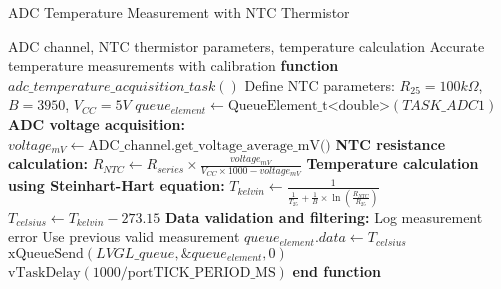\documentclass{article}
\begin{document}
\begin{algorithm}
\caption{ADC Temperature Measurement with NTC Thermistor}
\label{alg:adc_temperature_acquisition}
\begin{algorithmic}[1]
\REQUIRE ADC channel, NTC thermistor parameters, temperature calculation
\ENSURE Accurate temperature measurements with calibration
\STATE \textbf{function} $adc\_temperature\_acquisition\_task()$
\STATE Define NTC parameters: $R_{25} = 100k\Omega$, $B = 3950$, $V_{CC} = 5V$
\STATE $queue_{element} \leftarrow \text{QueueElement\_t<double>}(TASK\_ADC1)$
\STATE
{}
    \STATE \textbf{ADC voltage acquisition:}
    \STATE $voltage_{mV} \leftarrow \text{ADC\_channel.get\_voltage\_average\_mV()}$
    \STATE
    \STATE \textbf{NTC resistance calculation:}
    \STATE $R_{NTC} \leftarrow R_{series} \times \frac{voltage_{mV}}{V_{CC} \times 1000 - voltage_{mV}}$
    \STATE
    \STATE \textbf{Temperature calculation using Steinhart-Hart equation:}
    \STATE $T_{kelvin} \leftarrow \frac{1}{\frac{1}{T_{25}} + \frac{1}{B} \times \ln(\frac{R_{NTC}}{R_{25}})}$
    \STATE $T_{celsius} \leftarrow T_{kelvin} - 273.15$
    \STATE
    \STATE \textbf{Data validation and filtering:}
        \STATE Log measurement error
        \STATE Use previous valid measurement
    \ELSE
        \STATE $queue_{element}.data \leftarrow T_{celsius}$
        \STATE $\text{xQueueSend}(LVGL\_queue, \&queue_{element}, 0)$
    \ENDIF
    \STATE
    \STATE $\text{vTaskDelay}(1000 / \text{portTICK\_PERIOD\_MS})$ 
\ENDWHILE
\STATE \textbf{end function}
\end{algorithmic}
\end{algorithm}
\end{document}
